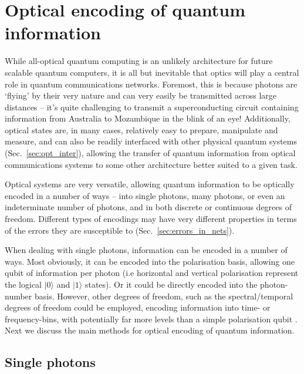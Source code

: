 \documentclass[aps, rmp, twocolumn, amsmath, amssymb, nofootinbib, superscriptaddress, longbibliography, floatfix, table-of-contents, eqsecnum]{revtex4-1}
\newcommand{\ket}[1]{|#1\rangle}
\begin{document}
%
%

\section{Optical encoding of quantum information} \label{sec:opt_enc_of_qi} 

While all-optical quantum computing is an unlikely architecture for future scalable quantum computers, it is all but inevitable that optics will play a central role in quantum communications networks. Foremost, this is because photons are `flying' by their very nature and can very easily be transmitted across large distances -- it's quite challenging to transmit a superconducting circuit containing information from Australia to Mozambique in the blink of an eye! Additionally, optical states are, in many cases, relatively easy to prepare, manipulate and measure, and can also be readily interfaced with other physical quantum systems (Sec.~\ref{sec:opt_inter}), allowing the transfer of quantum information from optical communications systems to some other architecture better suited to a given task.

Optical systems are very versatile, allowing quantum information to be optically encoded in a number of ways -- into single photons, many photons, or even an indeterminate number of photons, and in both discrete or continuous degrees of freedom. Different types of encodings may have very different properties in terms of the errors they are susceptible to (Sec.~\ref{sec:errors_in_nets}).

When dealing with single photons, information can be encoded in a number of ways. Most obviously, it can be encoded into the polarisation basis, allowing one qubit of information per photon (i.e horizontal and vertical polarisation represent the logical $\ket{0}$ and $\ket{1}$ states). Or it could be directly encoded into the photon-number basis. However, other degrees of freedom, such as the spectral/temporal degrees of freedom could be employed, encoding information into time- or frequency-bins, with potentially far more levels than a simple polarisation qubit \cite{bib:RohdeInfCap13}. Next we discuss the main methods for optical encoding of quantum information.

%
%

\subsection{Single photons} \label{sec:single_phot_enc} 
\end{document}
